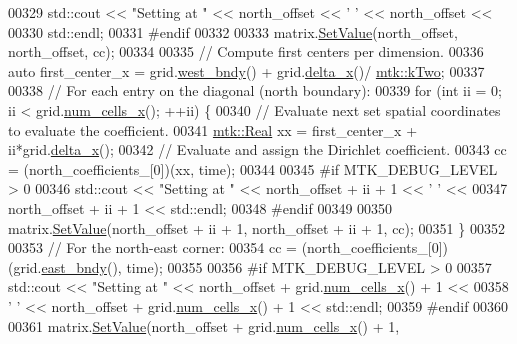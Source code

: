 \begin{DoxyCode}
00329   std::cout << \textcolor{stringliteral}{"Setting at "} << north\_offset << \textcolor{charliteral}{' '} << north\_offset <<
00330     std::endl;
00331 \textcolor{preprocessor}{  #endif}
00332 
00333   matrix.\hyperlink{classmtk_1_1DenseMatrix_a784ce5784109ac86bfb9d8562b334b13}{SetValue}(north\_offset, north\_offset, cc);
00334 
00335   \textcolor{comment}{// Compute first centers per dimension.}
00336   \textcolor{keyword}{auto} first\_center\_x = grid.\hyperlink{classmtk_1_1UniStgGrid2D_af2b1712387ded85edaf2b64617d3fc13}{west\_bndy}() + grid.\hyperlink{classmtk_1_1UniStgGrid2D_aca4710004c4a7da6a9e8fd6ab32a691f}{delta\_x}()/
      \hyperlink{group__c01-roots_gaf39c2d851a2db744f4feb1c5ab3ec2cf}{mtk::kTwo};
00337 
00338   \textcolor{comment}{// For each entry on the diagonal (north boundary):}
00339   \textcolor{keywordflow}{for} (\textcolor{keywordtype}{int} ii = 0; ii < grid.\hyperlink{classmtk_1_1UniStgGrid2D_a2d182866a398aba8e4829590e85bf939}{num\_cells\_x}(); ++ii) \{
00340     \textcolor{comment}{// Evaluate next set spatial coordinates to evaluate the coefficient.}
00341     \hyperlink{group__c01-roots_gac080bbbf5cbb5502c9f00405f894857d}{mtk::Real} xx = first\_center\_x + ii*grid.\hyperlink{classmtk_1_1UniStgGrid2D_aca4710004c4a7da6a9e8fd6ab32a691f}{delta\_x}();
00342     \textcolor{comment}{// Evaluate and assign the Dirichlet coefficient.}
00343     cc = (north\_coefficients\_[0])(xx, time);
00344 
00345 \textcolor{preprocessor}{    #if MTK\_DEBUG\_LEVEL > 0}
00346     std::cout << \textcolor{stringliteral}{"Setting at "} << north\_offset + ii + 1 << \textcolor{charliteral}{' '} <<
00347       north\_offset + ii + 1 << std::endl;
00348 \textcolor{preprocessor}{    #endif}
00349 
00350     matrix.\hyperlink{classmtk_1_1DenseMatrix_a784ce5784109ac86bfb9d8562b334b13}{SetValue}(north\_offset + ii + 1, north\_offset + ii + 1, cc);
00351   \}
00352 
00353   \textcolor{comment}{// For the north-east corner:}
00354   cc = (north\_coefficients\_[0])(grid.\hyperlink{classmtk_1_1UniStgGrid2D_a03f689eb29a6369b82ce1207c655d5ff}{east\_bndy}(), time);
00355 
00356 \textcolor{preprocessor}{  #if MTK\_DEBUG\_LEVEL > 0}
00357   std::cout << \textcolor{stringliteral}{"Setting at "} << north\_offset + grid.\hyperlink{classmtk_1_1UniStgGrid2D_a2d182866a398aba8e4829590e85bf939}{num\_cells\_x}() + 1 <<
00358     \textcolor{charliteral}{' '} << north\_offset + grid.\hyperlink{classmtk_1_1UniStgGrid2D_a2d182866a398aba8e4829590e85bf939}{num\_cells\_x}() + 1 << std::endl;
00359 \textcolor{preprocessor}{  #endif}
00360 
00361   matrix.\hyperlink{classmtk_1_1DenseMatrix_a784ce5784109ac86bfb9d8562b334b13}{SetValue}(north\_offset + grid.\hyperlink{classmtk_1_1UniStgGrid2D_a2d182866a398aba8e4829590e85bf939}{num\_cells\_x}() + 1,

\end{DoxyCode}
